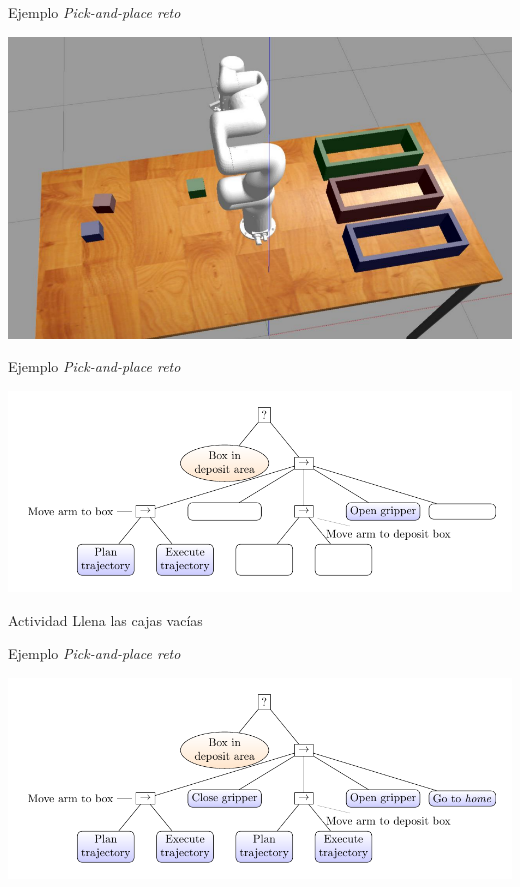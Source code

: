 \documentclass[presentation,aspectratio=169]{beamer}
\begin{document}
\begin{frame}[label={sec:org81d3a07}]{Ejemplo \emph{Pick-and-place reto}}
\begin{center}
  \includegraphics[width=0.8\linewidth]{../figures/reto-gazebo.png}
\end{center}
\end{frame}

\begin{frame}[label={sec:org873107f}]{Ejemplo \emph{Pick-and-place reto}}
\begin{center}
  \includegraphics[width=\linewidth]{../figures/bt-manipulator-task-exercise}
\end{center}

\alert{Actividad} Llena las cajas vacías
\end{frame}


\begin{frame}[label={sec:orgf9f168d}]{Ejemplo \emph{Pick-and-place reto}}
\begin{center}
  \includegraphics[width=\linewidth]{../figures/bt-manipulator-task}
\end{center}
\end{frame}
\end{document}
